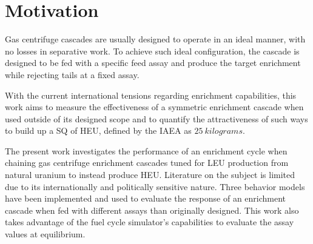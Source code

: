 \section{Motivation}

Gas centrifuge cascades are usually designed to operate in an ideal manner, with
no losses in separative work. To achieve such ideal configuration, the cascade
is designed to be fed with a specific feed assay and produce the target
enrichment while rejecting tails at a fixed assay.

With the current international tensions regarding enrichment capabilities, this
work aims to measure the effectiveness of a symmetric enrichment cascade when
used outside of its designed scope and to quantify the attractiveness %
of such ways
to build up a \gls{SQ} of \gls{HEU}, defined by the \gls{IAEA} as \(25 \ kilograms\)\cite{noauthor_iaea_2001}.

The present work investigates the performance of an enrichment cycle when chaining
gas centrifuge enrichment cascades tuned for \gls{LEU} production from natural uranium to instead produce \gls{HEU}. Literature on the subject is limited due to its
internationally and politically sensitive nature. Three behavior models have been
implemented and used to evaluate the response of an enrichment cascade when fed
with different assays than originally designed. This work also takes advantage
of the \Cyclus \cite{cyclus} fuel cycle simulator's capabilities to evaluate the
assay values at equilibrium.

